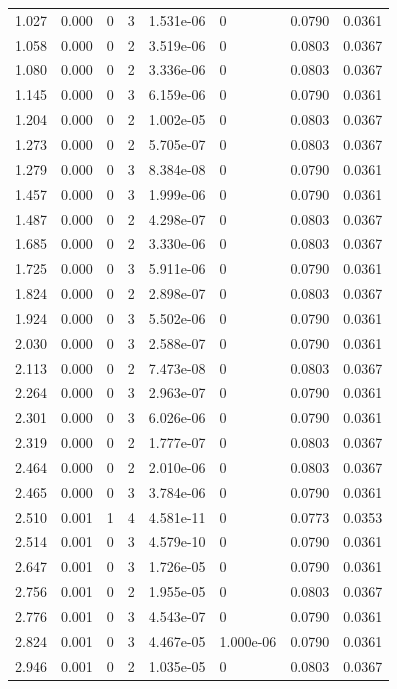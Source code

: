 \documentclass[preview]{standalone}
\begin{document}
{{\begin{tabular}{L{1.2cm}C{1.2cm} C{0.3cm}C{0.5cm} C{1.4cm}C{1.4cm} C{1.4cm}C{1.4cm}}
  1.027  &  0.000  & 0     &  3 &  1.531e-06  & 0  & 0.0790 &  0.0361   \\ 
  1.058  &  0.000  & 0     &  2 &  3.519e-06  & 0  & 0.0803 &  0.0367   \\ 
  1.080  &  0.000  & 0     &  2 &  3.336e-06  & 0  & 0.0803 &  0.0367   \\ 
  1.145  &  0.000  & 0     &  3 &  6.159e-06  & 0  & 0.0790 &  0.0361   \\ 
  1.204  &  0.000  & 0     &  2 &  1.002e-05  & 0  & 0.0803 &  0.0367   \\ 
  1.273  &  0.000  & 0     &  2 &  5.705e-07  & 0  & 0.0803 &  0.0367   \\ 
  1.279  &  0.000  & 0     &  3 &  8.384e-08  & 0  & 0.0790 &  0.0361   \\ 
  1.457  &  0.000  & 0     &  3 &  1.999e-06  & 0  & 0.0790 &  0.0361   \\ 
  1.487  &  0.000  & 0     &  2 &  4.298e-07  & 0  & 0.0803 &  0.0367   \\ 
  1.685  &  0.000  & 0     &  2 &  3.330e-06  & 0  & 0.0803 &  0.0367   \\ 
  1.725  &  0.000  & 0     &  3 &  5.911e-06  & 0  & 0.0790 &  0.0361   \\ 
  1.824  &  0.000  & 0     &  2 &  2.898e-07  & 0  & 0.0803 &  0.0367   \\ 
  1.924  &  0.000  & 0     &  3 &  5.502e-06  & 0  & 0.0790 &  0.0361   \\ 
  2.030  &  0.000  & 0     &  3 &  2.588e-07  & 0  & 0.0790 &  0.0361   \\ 
  2.113  &  0.000  & 0     &  2 &  7.473e-08  & 0  & 0.0803 &  0.0367   \\ 
  2.264  &  0.000  & 0     &  3 &  2.963e-07  & 0  & 0.0790 &  0.0361   \\ 
  2.301  &  0.000  & 0     &  3 &  6.026e-06  & 0  & 0.0790 &  0.0361   \\ 
  2.319  &  0.000  & 0     &  2 &  1.777e-07  & 0  & 0.0803 &  0.0367   \\ 
  2.464  &  0.000  & 0     &  2 &  2.010e-06  & 0  & 0.0803 &  0.0367   \\ 
  2.465  &  0.000  & 0     &  3 &  3.784e-06  & 0  & 0.0790 &  0.0361   \\ 
  2.510  &  0.001  & 1     &  4 &  4.581e-11  & 0  & 0.0773 &  0.0353   \\ 
  2.514  &  0.001  & 0     &  3 &  4.579e-10  & 0  & 0.0790 &  0.0361   \\ 
  2.647  &  0.001  & 0     &  3 &  1.726e-05  & 0  & 0.0790 &  0.0361   \\ 
  2.756  &  0.001  & 0     &  2 &  1.955e-05  & 0  & 0.0803 &  0.0367   \\ 
  2.776  &  0.001  & 0     &  3 &  4.543e-07  & 0  & 0.0790 &  0.0361   \\ 
  2.824  &  0.001  & 0     &  3 &  4.467e-05  & 1.000e-06  & 0.0790 &  0.0361   \\ 
  2.946  &  0.001  & 0     &  2 &  1.035e-05  & 0  & 0.0803 &  0.0367   \\ 
\hline 
\end{tabular} 

}}
\end{document}
